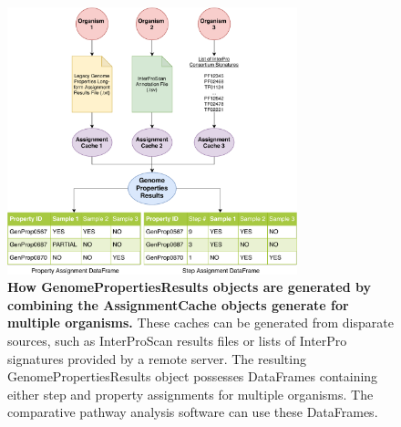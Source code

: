 \begin{figure}[!ht]
  \centering
	\includegraphics[width=0.75\textwidth]{media/assignment_results_overview.pdf}
	 \caption[How GenomePropertiesResults objects are generated by combining the 
AssignmentCache objects generate for multiple 
organisms.]{\textbf{How GenomePropertiesResults objects are generated by combining the 
AssignmentCache objects generate for multiple organisms.} These caches can be 
generated from disparate sources, such as InterProScan results files or lists of 
InterPro signatures provided by a remote server. The resulting 
GenomePropertiesResults object possesses DataFrames containing either step and 
property assignments for multiple organisms. The comparative pathway analysis 
software can use these DataFrames.}
	 \label{fig:resultscreation}
\end{figure}

